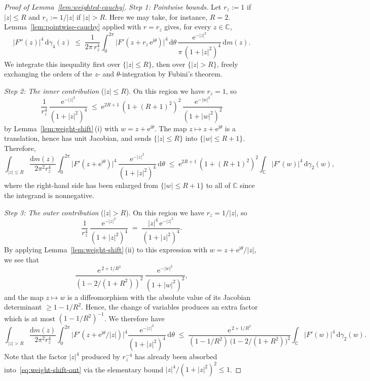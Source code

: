 \documentclass[11pt]{amsart}
\theoremstyle{remark}
\newcommand{\C}{\mathbb{C}}
\newcommand{\abs}[1]{\lvert #1 \rvert}
\newcommand{\dd}{\mathrm{d}}
\newcommand{\ee}{\mathrm{e}}
\newcommand{\ii}{\mathrm{i}}
\begin{document}
\begin{proof}[Proof of Lemma~\ref{lem:weighted-cauchy}]

\medskip
\noindent\emph{Step 1: Pointwise bounds.}\;
Let $r_{z} := 1$ if $\abs{z}\le R$ and $r_{z} := 1/\abs{z}$
if $\abs{z}>R$. Here we may take, for instance, $R=2$. Lemma~\ref{lem:pointwise-cauchy} applied
with $r = r_{z}$ gives, for every $z \in \C$,
\[
\abs{F''(z)}^{4}\,\dd\gamma_{4}(z)
\;\le\;
\frac{1}{2\pi\, r_{z}^{4}}\int_{0}^{2\pi}
\abs{F'(z + r_{z}\,\ee^{\ii\theta})}^{4}\, \dd\theta\,
\frac{\ee^{-\abs{z}^{2}}}{\pi\,(1+\abs{z}^{2})^{4}}\,\dd m(z).
\]
We integrate this inequality first over $\{\abs{z}\le R\}$, then over
$\{\abs{z}>R\}$, freely exchanging the orders of the $z$- and
$\theta$-integration by Fubini's theorem.

\medskip
\noindent\emph{Step 2: The inner contribution} ($\abs{z}\le R$).
On this region we have $r_{z} = 1$, so
\[
\frac{1}{r_{z}^{4}}\,\frac{\ee^{-\abs{z}^{2}}}{(1+\abs{z}^{2})^{4}}
\;\le\;
\ee^{2R+1}\,(1+(R+1)^{2})^{2}\,\frac{\ee^{-\abs{w}^{2}}}{(1+\abs{w}^{2})^{2}}
\]
by Lemma~\ref{lem:weight-shift}\,(i) with $w = z + \ee^{\ii\theta}$.
The map $z \mapsto z + \ee^{\ii\theta}$ is a translation, hence has unit
Jacobian, and sends $\{\abs{z}\le R\}$ into $\{\abs{w}\le R+1\}$.
Therefore,
\[
\int_{\abs{z}\le R}\!\frac{\dd m(z)}{2\pi^{2} r_{z}^{4}}\!
\int_{0}^{2\pi}\!\!\abs{F'(z + \ee^{\ii\theta})}^{4}\,
\frac{\ee^{-\abs{z}^{2}}}{(1+\abs{z}^{2})^{4}}\,\dd\theta
\;\le\;
\ee^{2R+1}\,(1+(R+1)^{2})^{2}
\int_{\C}\!\abs{F'(w)}^{4}\,\dd\gamma_{2}(w),
\]
where the right-hand side has been enlarged from $\{\abs{w}\le R+1\}$
to all of $\C$ since the integrand is nonnegative.

\medskip
\noindent\emph{Step 3: The outer contribution} ($\abs{z}>R$).
On this region we have $r_{z} = 1/\abs{z}$, so
\[
\frac{1}{r_{z}^{4}}\,\frac{\ee^{-\abs{z}^{2}}}{(1+\abs{z}^{2})^{4}}
\;=\;
\frac{\abs{z}^{4}\,\ee^{-\abs{z}^{2}}}{(1+\abs{z}^{2})^{4}}.
\]
By applying Lemma~\ref{lem:weight-shift}\,(ii) to this expression with
$w = z + \ee^{\ii\theta}/\abs{z}$, we see that
\[
\frac{\ee^{\,2 + 1/R^{2}}}{(1-2/(1+R^{2}))^{2}}\,
\frac{\ee^{-\abs{w}^{2}}}{(1+\abs{w}^{2})^{2}},
\]
and the map $z\mapsto w$ is a diffeomorphism with the absolute value of its Jacobian
determinant $\ge 1 - 1/R^{2}$. Hence, the change of variables produces an
extra factor which is at most $(1-1/R^{2})^{-1}$. We therefore have
\[
\int_{\abs{z}>R}\frac{\dd m(z)}{2\pi^{2}r_{z}^{4}}
\int_{0}^{2\pi}\!\!\abs{F'(z+\ee^{\ii\theta}/\abs{z})}^{4}
\frac{\ee^{-\abs{z}^{2}}}{(1+\abs{z}^{2})^{4}}\,\dd\theta
\;\le\;
\frac{\ee^{\,2+1/R^{2}}}
{(1-1/R^{2})\,\bigl(1-2/(1+R^{2})\bigr)^{2}}
\int_{\C}\abs{F'(w)}^{4}\,\dd\gamma_{2}(w).
\]
Note that the factor $\abs{z}^{4}$ produced by $r_{z}^{-4}$ has already
been absorbed into~\eqref{eq:weight-shift-out} via the elementary
bound $\abs{z}^{4}/(1+\abs{z}^{2})^{2}\le 1$.
\medskip


\end{proof}
\end{document}
